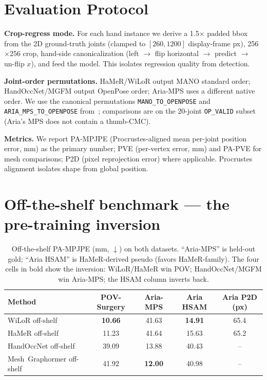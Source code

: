 \documentclass{article}
\begin{document}
\section{Evaluation Protocol}
\label{sec:protocol}

\textbf{Crop-regress mode.} For each hand instance we derive a 1.5$\times$ padded bbox from the 2D ground-truth joints (clamped to $[260,1200]$ display-frame px), 256$\times$256 crop, hand-side canonicalization (left $\to$ flip horizontal $\to$ predict $\to$ un-flip $x$), and feed the model. This isolates regression quality from detection.

\textbf{Joint-order permutations.} HaMeR/WiLoR output MANO standard order; HandOccNet/MGFM output OpenPose order; Aria-MPS uses a different native order. We use the canonical permutations \texttt{MANO\_TO\_OPENPOSE} and \texttt{ARIA\_MPS\_TO\_OPENPOSE} from~\cite{romero2017mano}; comparisons are on the 20-joint \texttt{OP\_VALID} subset (Aria's MPS does not contain a thumb-CMC).

\textbf{Metrics.} We report PA-MPJPE (Procrustes-aligned mean per-joint position error, mm) as the primary number; PVE (per-vertex error, mm) and PA-PVE for mesh comparisons; P2D (pixel reprojection error) where applicable. Procrustes alignment isolates shape from global position.

\section{Off-the-shelf benchmark — the pre-training inversion}
\label{sec:offshelf}

\begin{table}[h]
\centering
\small
\caption{Off-the-shelf PA-MPJPE (mm, $\downarrow$) on both datasets. ``Aria-MPS'' is held-out gold; ``Aria HSAM'' is HaMeR-derived pseudo (favors HaMeR-family). The four cells in bold show the inversion: WiLoR/HaMeR win POV; HandOccNet/MGFM win Aria-MPS; the HSAM column inverts back.}
\label{tab:headline}
\begin{tabular}{lcccc}
\toprule
\textbf{Method} & \textbf{POV-Surgery} & \textbf{Aria-MPS} & \textbf{Aria HSAM} & \textbf{Aria P2D (px)} \\
\midrule
WiLoR off-shelf            & \textbf{10.66} & 41.63           & \textbf{14.91} & 65.4 \\
HaMeR off-shelf            & 11.23          & 41.64           & 15.63          & 65.2 \\
HandOccNet off-shelf       & 39.09          & 13.88           & 40.43          & --   \\
Mesh~Graphormer off-shelf  & 41.92          & \textbf{12.00}  & 40.98          & --   \\
\bottomrule
\end{tabular}
\end{table}
\end{document}
